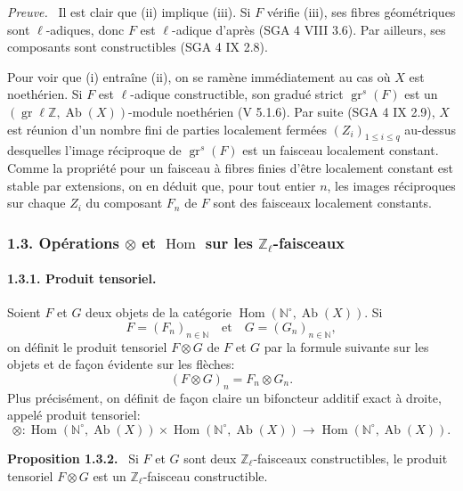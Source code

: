 \documentclass[11pt]{article}
\newenvironment{statement}[1]{\par\medskip\noindent\textbf{#1.}\ }{\par\medskip}
\newenvironment{prooftext}[1][Proof]{\par\noindent\emph{#1.}\ }{\par\medskip}
\DeclareMathOperator{\Hom}{Hom}
\providecommand{\Hom}{\operatorname{Hom}}
\providecommand{\Ab}{\operatorname{Ab}}
\begin{document}
\begin{prooftext}[Preuve]
Il est clair que (ii) implique (iii). Si \(F\) vérifie (iii), ses fibres géométriques sont \(\ell\)-adiques, donc \(F\) est \(\ell\)-adique d'après (SGA 4 VIII 3.6). Par ailleurs, ses composants sont constructibles (SGA 4 IX 2.8).

Pour voir que (i) entraîne (ii), on se ramène immédiatement au cas où \(X\) est noethérien. Si \(F\) est \(\ell\)-adique constructible, son gradué strict \(\operatorname{gr}^s(F)\) est un \((\operatorname{gr}\ell\mathbb Z,\Ab(X))\)-module noethérien (V 5.1.6). Par suite (SGA 4 IX 2.9), \(X\) est réunion d'un nombre fini de parties localement fermées \((Z_i)_{1\le i\le q}\) au-dessus desquelles l'image réciproque de \(\operatorname{gr}^s(F)\) est un faisceau localement constant. Comme la propriété pour un faisceau à fibres finies d'être localement constant est stable par extensions, on en déduit que, pour tout entier \(n\), les images réciproques sur chaque \(Z_i\) du composant \(F_n\) de \(F\) sont des faisceaux localement constants.
\end{prooftext}

\subsubsection*{1.3. Opérations \(\otimes\) et \(\Hom\) sur les \(\mathbb Z_\ell\)-faisceaux}

\paragraph{1.3.1. Produit tensoriel.}
Soient \(F\) et \(G\) deux objets de la catégorie \(\Hom(\mathbb N^\circ,\Ab(X))\). Si
\[
F=(F_n)_{n\in\mathbb N}\quad\text{et}\quad G=(G_n)_{n\in\mathbb N},
\]
on définit le produit tensoriel \(F\otimes G\) de \(F\) et \(G\) par la formule suivante sur les objets et de façon évidente sur les flèches:
\[
(F\otimes G)_n=F_n\otimes G_n.
\]
Plus précisément, on définit de façon claire un bifoncteur additif exact à droite, appelé produit tensoriel:
\[
\otimes:\Hom(\mathbb N^\circ,\Ab(X))\times \Hom(\mathbb N^\circ,\Ab(X))
\longrightarrow \Hom(\mathbb N^\circ,\Ab(X)).
\]

\begin{statement}{Proposition 1.3.2}
Si \(F\) et \(G\) sont deux \(\mathbb Z_\ell\)-faisceaux constructibles, le produit tensoriel \(F\otimes G\) est un \(\mathbb Z_\ell\)-faisceau constructible.
\end{statement}
\end{document}
